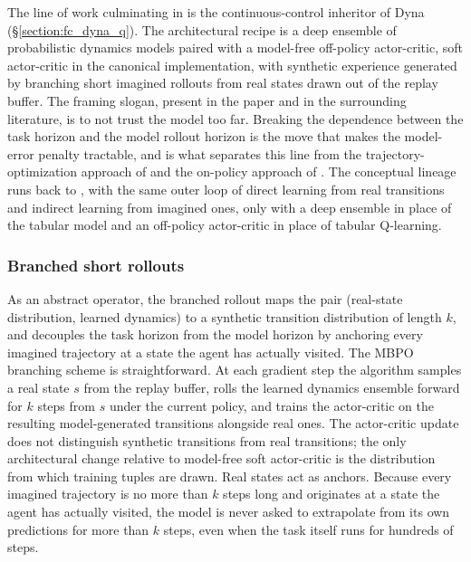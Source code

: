 The line of work culminating in \citet{janner2019model} is the continuous-control inheritor of Dyna (\S\ref{section:fc_dyna_q}). The architectural recipe is a deep ensemble of probabilistic dynamics models paired with a model-free off-policy actor-critic, soft actor-critic in the canonical implementation, with synthetic experience generated by branching short imagined rollouts from real states drawn out of the replay buffer. The framing slogan, present in the paper and in the surrounding literature, is to not trust the model too far. Breaking the dependence between the task horizon and the model rollout horizon is the move that makes the model-error penalty tractable, and is what separates this line from the trajectory-optimization approach of \citet{Chua2018PETS} and the on-policy approach of \citet{Kurutach2018}. The conceptual lineage runs back to \citet{sutton1990}, with the same outer loop of direct learning from real transitions and indirect learning from imagined ones, only with a deep ensemble in place of the tabular model and an off-policy actor-critic in place of tabular Q-learning.

\subsubsection{Branched short rollouts}
\label{section:fc_mbpo_branching}

As an abstract operator, the branched rollout maps the pair (real-state distribution, learned dynamics) to a synthetic transition distribution of length $k$, and decouples the task horizon from the model horizon by anchoring every imagined trajectory at a state the agent has actually visited. The MBPO branching scheme is straightforward. At each gradient step the algorithm samples a real state $s$ from the replay buffer, rolls the learned dynamics ensemble forward for $k$ steps from $s$ under the current policy, and trains the actor-critic on the resulting model-generated transitions alongside real ones. The actor-critic update does not distinguish synthetic transitions from real transitions; the only architectural change relative to model-free soft actor-critic is the distribution from which training tuples are drawn. Real states act as anchors. Because every imagined trajectory is no more than $k$ steps long and originates at a state the agent has actually visited, the model is never asked to extrapolate from its own predictions for more than $k$ steps, even when the task itself runs for hundreds of steps.

